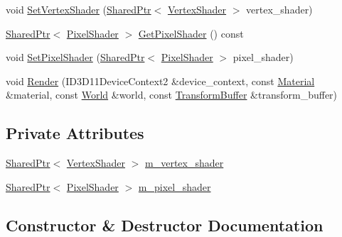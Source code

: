 \begin{DoxyCompactItemize}
\item 
void \hyperlink{structmage_1_1_combined_shader_a9c7c71b12847cec8cffc4f909b84a50a}{Set\+Vertex\+Shader} (\hyperlink{namespacemage_a1e01ae66713838a7a67d30e44c67703e}{Shared\+Ptr}$<$ \hyperlink{classmage_1_1_vertex_shader}{Vertex\+Shader} $>$ vertex\+\_\+shader)
\item 
\hyperlink{namespacemage_a1e01ae66713838a7a67d30e44c67703e}{Shared\+Ptr}$<$ \hyperlink{classmage_1_1_pixel_shader}{Pixel\+Shader} $>$ \hyperlink{structmage_1_1_combined_shader_a70b9d991d76c07aff7e6e83cc5f715b1}{Get\+Pixel\+Shader} () const
\item 
void \hyperlink{structmage_1_1_combined_shader_a0d6c2bd58066a423a90cf8368e0a2d66}{Set\+Pixel\+Shader} (\hyperlink{namespacemage_a1e01ae66713838a7a67d30e44c67703e}{Shared\+Ptr}$<$ \hyperlink{classmage_1_1_pixel_shader}{Pixel\+Shader} $>$ pixel\+\_\+shader)
\item 
void \hyperlink{structmage_1_1_combined_shader_a44e0bbd1342b772d4d1d49b4e614f3b1}{Render} (I\+D3\+D11\+Device\+Context2 \&device\+\_\+context, const \hyperlink{structmage_1_1_material}{Material} \&material, const \hyperlink{classmage_1_1_world}{World} \&world, const \hyperlink{structmage_1_1_transform_buffer}{Transform\+Buffer} \&transform\+\_\+buffer)
\end{DoxyCompactItemize}
\subsection*{Private Attributes}
\begin{DoxyCompactItemize}
\item 
\hyperlink{namespacemage_a1e01ae66713838a7a67d30e44c67703e}{Shared\+Ptr}$<$ \hyperlink{classmage_1_1_vertex_shader}{Vertex\+Shader} $>$ \hyperlink{structmage_1_1_combined_shader_ae70a1404acc466fc7fbcb05756140f54}{m\+\_\+vertex\+\_\+shader}
\item 
\hyperlink{namespacemage_a1e01ae66713838a7a67d30e44c67703e}{Shared\+Ptr}$<$ \hyperlink{classmage_1_1_pixel_shader}{Pixel\+Shader} $>$ \hyperlink{structmage_1_1_combined_shader_a562b58278dcb98469c98250a636c640e}{m\+\_\+pixel\+\_\+shader}
\end{DoxyCompactItemize}


\subsection{Constructor \& Destructor Documentation}
\hypertarget{structmage_1_1_combined_shader_ab9d6ce4dc9ed2602b19729ee8d126f61}{}\label{structmage_1_1_combined_shader_ab9d6ce4dc9ed2602b19729ee8d126f61} 

